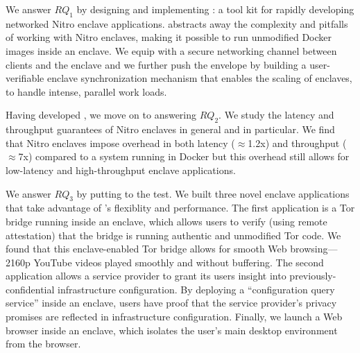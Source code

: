 We answer $RQ_1$ by designing and implementing \tool{}: a tool kit for rapidly
developing networked Nitro enclave applications.  \Tool{} abstracts away the
complexity and pitfalls of working with Nitro enclaves, making it possible to
run unmodified Docker images inside an enclave.  We equip \tool{} with a secure
networking channel between clients and the enclave and we further push the
envelope by building a user-verifiable enclave synchronization mechanism that
enables the scaling of enclaves, to handle intense, parallel work loads.

Having developed \tool{}, we move on to answering $RQ_2$.  We study the
latency and throughput guarantees of Nitro enclaves in general and \tool{} in
particular.  We find that Nitro enclaves impose overhead in both latency
($\approx$1.2x) and throughput ($\approx$7x) compared to a system running in
Docker but this overhead still allows for low-latency and high-throughput
enclave applications.

We answer $RQ_3$ by putting \tool{} to the test.  We built three novel enclave
applications that take advantage of \tool{}'s flexiblity and performance.  The
first application is a Tor bridge running inside an enclave, which allows users
to verify (using remote attestation) that the bridge is running
authentic and unmodified Tor code.  We found that this enclave-enabled Tor
bridge allows for smooth Web browsing---2160p YouTube videos played smoothly
and without buffering.  The second application allows a service provider to
grant its users insight into previously-confidential infrastructure
configuration.  By deploying a ``configuration query service'' inside an
enclave, users have proof that the service provider's privacy promises are
reflected in infrastructure configuration.  Finally, we launch a Web browser
inside an enclave, which isolates the user's main desktop environment from the
browser.
